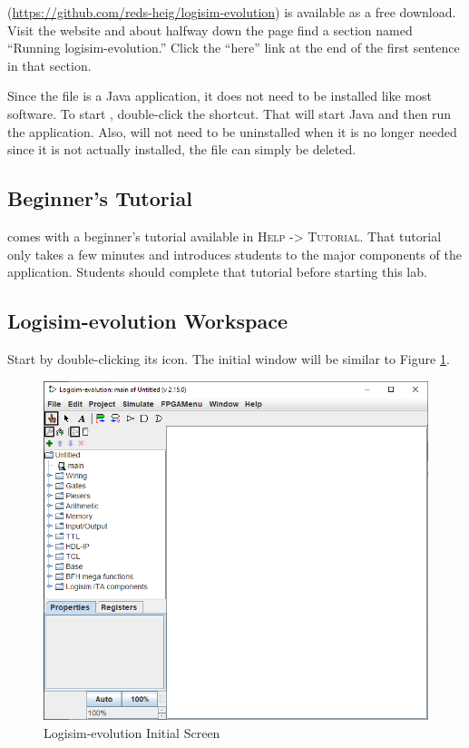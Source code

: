 \LE (\url{https://github.com/reds-heig/logisim-evolution}) is available as a free download. Visit the website and about halfway down the page find a section named ``Running logisim-evolution.'' Click the ``here'' link at the end of the first sentence in that section. 

Since the \LE file is a Java application, it does not need to be installed like most software. To start \LE, double-click the \LE shortcut. That will start Java and then run the \LE application. Also, \LE will not need to be uninstalled when it is no longer needed since it is not actually installed, the \LE file can simply be deleted.

\subsection{Beginner's Tutorial}

\LE comes with a beginner's tutorial available in \textsc{Help -> Tutorial}. That tutorial only takes a few minutes and introduces students to the major components of the application. Students should complete that tutorial before starting this lab.

\subsection{Logisim-evolution Workspace}

Start \LE by double-clicking its icon. The initial \LE window will be similar to Figure \ref{fig:01-01}.

\begin{figure}[H]
	\centering
	\includegraphics[width=\maxwidth{.95\linewidth}]{gfx/01-01}
	\caption{Logisim-evolution Initial Screen}
	\label{fig:01-01}
\end{figure}

